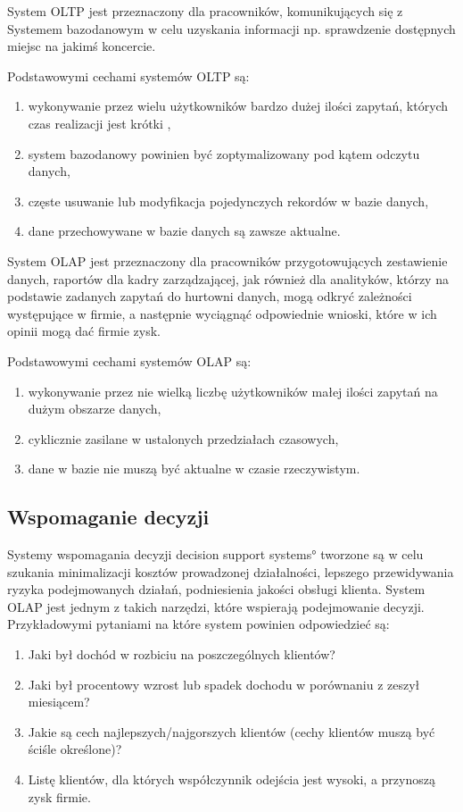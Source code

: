 System OLTP jest przeznaczony dla pracowników, komunikujących się 
 z Systemem bazodanowym w celu uzyskania informacji 
 np. sprawdzenie dostępnych miejsc na jakimś koncercie.

Podstawowymi cechami systemów OLTP są:
\begin{enumerate}
 \item wykonywanie przez wielu użytkowników bardzo dużej ilości zapytań, których czas realizacji jest krótki  \label{OLTP_1},
 \item system bazodanowy powinien być zoptymalizowany pod kątem odczytu danych,
 \item częste usuwanie lub modyfikacja pojedynczych rekordów w bazie danych,
 \item dane przechowywane w bazie danych są zawsze aktualne.
\end{enumerate}

System OLAP jest przeznaczony dla pracowników przygotowujących zestawienie danych,
 raportów dla kadry zarządzającej, jak również dla analityków, 
 którzy na podstawie zadanych zapytań do hurtowni danych,
 mogą odkryć zależności występujące w firmie, a następnie wyciągnąć odpowiednie wnioski,
 które w ich opinii mogą dać firmie zysk.
 
Podstawowymi cechami systemów OLAP są:
\begin{enumerate}
 \item wykonywanie przez nie wielką liczbę użytkowników małej ilości zapytań na dużym obszarze danych,
 \item cyklicznie zasilane w ustalonych przedziałach czasowych,
 \item dane w bazie nie muszą być aktualne w czasie rzeczywistym.
\end{enumerate}


\subsection{Wspomaganie decyzji }
Systemy wspomagania decyzji \ang{decision support systems} tworzone są 
 w celu szukania minimalizacji kosztów prowadzonej działalności,
 lepszego przewidywania ryzyka podejmowanych działań, podniesienia jakości obsługi klienta. System OLAP jest 
 jednym z takich narzędzi, które wspierają podejmowanie decyzji.
Przykładowymi pytaniami na które system powinien odpowiedzieć są:
 \begin{enumerate}
  \item Jaki był dochód w rozbiciu na poszczególnych klientów?
  \item Jaki był procentowy wzrost lub spadek dochodu w porównaniu z zeszył miesiącem?
  \item Jakie są cech najlepszych/najgorszych klientów (cechy klientów muszą być ściśle określone)?
  \item Listę klientów, dla których współczynnik odejścia jest wysoki, a przynoszą zysk firmie.
 
 \end{enumerate}

